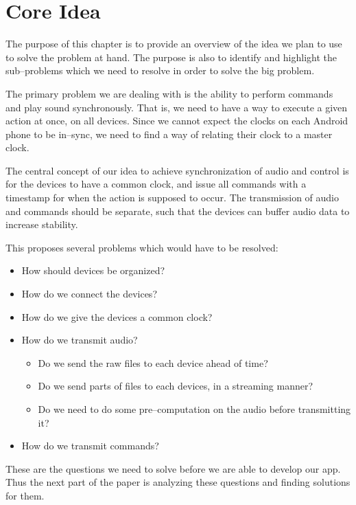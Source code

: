 \chapter{Core Idea} %

The purpose of this chapter is to provide an overview of the idea we plan to use to solve the problem at hand. 
The purpose is also to identify and highlight the sub--problems which we need to resolve in order to solve the big problem.

The primary problem we are dealing with is the ability to perform commands and play sound synchronously.
That is, we need to have a way to execute a given action at once, on all devices.
Since we cannot expect the clocks on each Android phone to be in--sync, we need to find a way of relating their clock to a master clock. 

The central concept of our idea to achieve synchronization of audio and control is for the devices to have a common clock, and issue all commands with a timestamp for when the action is supposed to occur. 
The transmission of audio and commands should be separate, such that the devices can buffer audio data to increase stability. 

This proposes several problems which would have to be resolved:
\begin{itemize}
    \item How should devices be organized?
    \item How do we connect the devices?
    \item How do we give the devices a common clock?
    \item How do we transmit audio?
    \begin{itemize}
        \item Do we send the raw files to each device ahead of time?
        \item Do we send parts of files to each devices, in a streaming manner?
        \item Do we need to do some pre--computation on the audio before transmitting it?
    \end{itemize}
    \item How do we transmit commands?
\end{itemize}

These are the questions we need to solve before we are able to develop our app. 
Thus the next part of the paper is analyzing these questions and finding solutions for them. 

